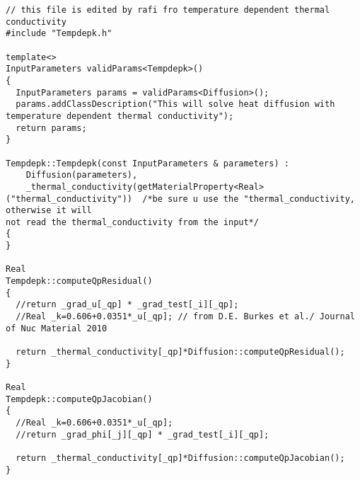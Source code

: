 \begin{lstlisting}
// this file is edited by rafi fro temperature dependent thermal conductivity
#include "Tempdepk.h"

template<>
InputParameters validParams<Tempdepk>()
{
  InputParameters params = validParams<Diffusion>();
  params.addClassDescription("This will solve heat diffusion with temperature dependent thermal conductivity");
  return params;
}

Tempdepk::Tempdepk(const InputParameters & parameters) :
    Diffusion(parameters),
	_thermal_conductivity(getMaterialProperty<Real>("thermal_conductivity"))  /*be sure u use the "thermal_conductivity, otherwise it will
not read the thermal_conductivity from the input*/
{
}

Real
Tempdepk::computeQpResidual()
{
  //return _grad_u[_qp] * _grad_test[_i][_qp];
  //Real _k=0.606+0.0351*_u[_qp]; // from D.E. Burkes et al./ Journal of Nuc Material 2010

  return _thermal_conductivity[_qp]*Diffusion::computeQpResidual();
}

Real
Tempdepk::computeQpJacobian()
{
  //Real _k=0.606+0.0351*_u[_qp];
  //return _grad_phi[_j][_qp] * _grad_test[_i][_qp];

  return _thermal_conductivity[_qp]*Diffusion::computeQpJacobian();
}

\end{lstlisting}
\pagebreak

